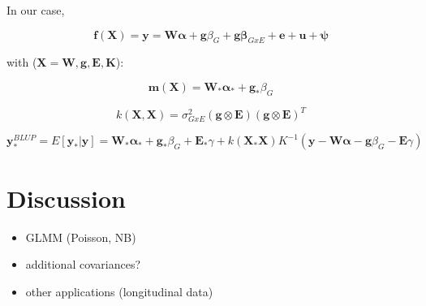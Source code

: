 In our case,

\begin{equation}
    \mathbf{f}(\mathbf{X}) = \mathbf{y} = \mathbf{W}\boldsymbol{\alpha}+\mathbf{g}\beta_G+\mathbf{g}\boldsymbol{\beta}_{GxE}+\mathbf{e} + \mathbf{u} + \boldsymbol{\psi}
\end{equation}

with ($\mathbf{X} = {\mathbf{W},\mathbf{g},\mathbf{E},\mathbf{K}}$):

\begin{equation}
    \mathbf{m}(\mathbf{X}) = \mathbf{W}_*\boldsymbol{\alpha}_{*}+\mathbf{g}_*\beta_G
\end{equation}

\begin{equation}
    k(\mathbf{X},\mathbf{X}) = \sigma_{GxE}^2(\mathbf{g}\otimes\mathbf{E})(\mathbf{g}\otimes\mathbf{E})^T
\end{equation}

\begin{equation}
\mathbf{y}_{*}^{BLUP} = E[\mathbf{y}_*|\mathbf{y}] = 
\mathbf{W}_*\boldsymbol{\alpha}_{*}+\mathbf{g}_*\beta_G+\mathbf{E}_*\gamma + 
k(\mathbf{X}_*\mathbf{X})K^{-1}(\mathbf{y}-\mathbf{W}\boldsymbol{\alpha}-\mathbf{g}\beta_G-\mathbf{E}\gamma)
\end{equation}

\section{Discussion}

\begin{itemize}
    \item GLMM (Poisson, NB)
    \item additional covariances?
    \item other applications (longitudinal data)
\end{itemize}
